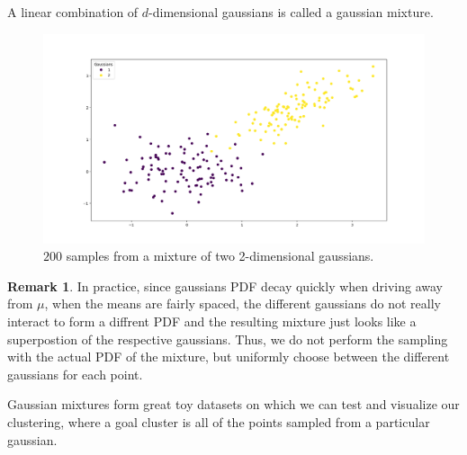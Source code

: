 \documentclass[a4paper,12pt]{article}
\theoremstyle{definition}
\newtheorem*{rem}{Remark}
\theoremstyle{plain}
\begin{document}
A linear combination of $d$-dimensional gaussians is called a gaussian mixture.
\begin{figure}[H]
	\centering
	\includegraphics[width=0.6\linewidth]{figures/2gm}
	\caption{$200$ samples from a mixture of two 2-dimensional gaussians.}
	\label{fig:2gm}
\end{figure}
\begin{rem} 
	In practice, since gaussians PDF decay quickly when driving away from $\mu$, when the means are fairly spaced, the different gaussians do not really interact to form a diffrent PDF and the resulting mixture just looks like a superpostion of the respective gaussians. Thus, we do not perform the sampling with the actual PDF of the mixture, but uniformly choose between the different gaussians for each point.
\end{rem}
Gaussian mixtures form great toy datasets on which we can test and visualize our clustering, where a goal cluster is all of the points sampled from a particular gaussian.
\end{document}
